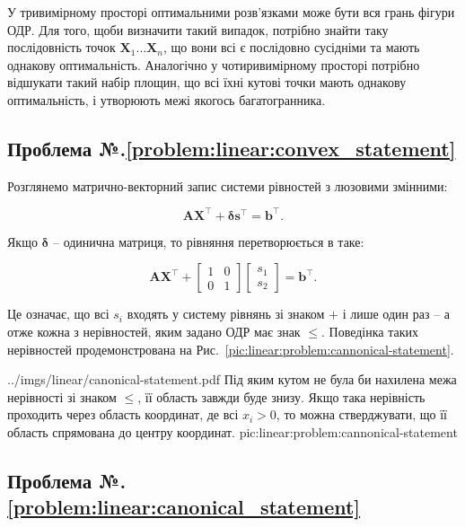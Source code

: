 \documentclass[\main/book.tex]{subfiles}
\begin{document}
У тривимірному просторі оптимальними розв'язками може бути вся грань фігури ОДР. Для того, щоби визначити такий випадок, потрібно знайти таку послідовність точок $\mathbf{X}_1 \ldots \mathbf{X}_n$, що вони всі є послідовно сусідніми та мають однакову оптимальність. Аналогічно у чотиривимірному просторі потрібно відшукати такий набір площин, що всі їхні кутові точки мають однакову оптимальність, і утворюють межі якогось багатогранника.

\subsection*{Проблема №.\ref{problem:linear:convex_statement}}

Розглянемо матрично-векторний запис системи рівностей з люзовими змінними:

\[
 \mathbf{A} \mathbf{X}^\top + \mathbf{\delta} \mathbf{s}^\top = \mathbf{b}^\top\text{.}
\]

Якщо $\mathbf{\delta}$ -- одинична матриця, то рівняння перетворюється в таке:


\[
 \mathbf{A} \mathbf{X}^\top +
 \left[
  \begin{array}{cc}
   1 & 0 \\
   0 & 1
  \end{array}
 \right]
 \left[
  \begin{array}{c}
   s_1 \\
   s_2
  \end{array}
 \right] = \mathbf{b}^\top\text{.}
\]

Це означає, що всі $s_i$ входять у систему рівнянь зі знаком \flqq{}$+$\frqq{} і лише один раз -- а отже кожна з нерівностей, яким задано ОДР має знак \flqq{}$\leq$\frqq{}. Поведінка таких нерівностей продемонстрована на Рис.~\ref{pic:linear:problem:cannonical-statement}.

\illustration
 {../imgs/linear/canonical-statement.pdf}
 {Під яким кутом не була би нахилена межа нерівності зі знаком \flqq{}$\leq$\frqq{}, її область завжди буде знизу. Якщо така нерівність проходить через область координат, де всі $x_i > 0$, то можна стверджувати, що її область спрямована до центру координат.}
 {pic:linear:problem:cannonical-statement}

\subsection*{Проблема №.\ref{problem:linear:canonical_statement}}
\end{document}

